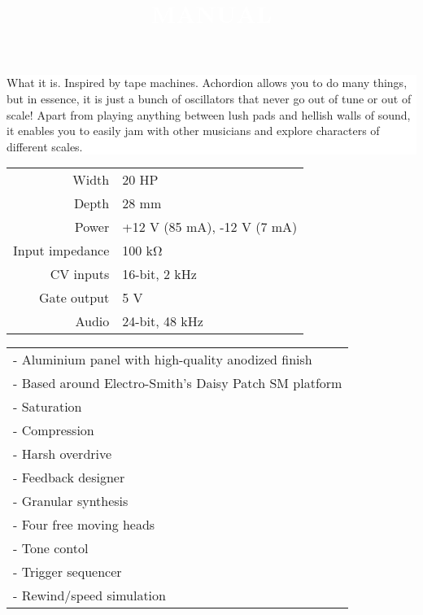 \documentclass[11pt]{article}
\begin{document}
\pagecolor{black}\afterpage{\nopagecolor}

\title{\textcolor{white}{MANUAL}}
\author{}
\date{}

\begin{minipage}{0.4\textwidth}
\color{white}
\maketitle

\noindent\colorbox{white}
{
\begin{minipage}{0.85\textwidth}\color{black}
What it is. Inspired by tape machines. Achordion allows you to do many things, but in essence, it is just a bunch of oscillators that never go out of tune or out of scale! Apart from playing anything between lush pads and hellish walls of sound, it enables you to easily jam with other musicians and explore characters of different scales.
\end{minipage}
}

\vspace{1cm}

\begin{minipage}{0.8\textwidth}\color{white}
\begin{tabular}{@{}rl@{}}
  Width & 20 HP \\
  Depth & 28 mm \\
  Power & +12 V (85 mA), -12 V (7 mA) \\
  Input impedance & 100 kΩ \\
  CV inputs & 16-bit, 2 kHz \\
  Gate output & 5 V \\
  Audio & 24-bit, 48 kHz
\end{tabular}
\end{minipage}

\vspace{1cm}

\begin{minipage}{0.8\textwidth}\color{white}
\begin{tabular}{@{}l}
  - Aluminium panel with high-quality anodized finish \\
  - Based around Electro-Smith's Daisy Patch SM platform \\
  - Saturation \\
  - Compression \\
  - Harsh overdrive \\
  - Feedback designer \\
  - Granular synthesis \\
  - Four free moving heads \\
  - Tone contol \\
  - Trigger sequencer \\
  - Rewind/speed simulation
\end{tabular}
\end{minipage}

\end{minipage}%
\end{document}
